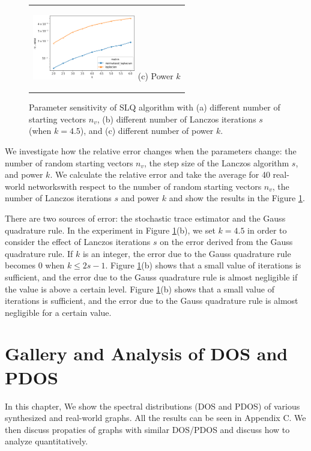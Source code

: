 \documentclass[senior,final,11pt]{iscs-thesis}
\begin{document}
\begin{figure}[htbp]
\begin{center}
\begin{tabular}{c}
\begin{minipage}{0.33\hsize}
          \begin{center}
            \includegraphics[clip, width=4.5cm]{./figure/plot_param_k.png}
            \hspace{1.6cm} (c) Power $k$
          \end{center}
        \end{minipage}
      \end{tabular}
      \caption{Parameter sensitivity of SLQ algorithm with (a) different number of starting vectors $n_v$, (b) different number of Lanczos iterations $s$ (when $k=4.5$), and (c) different number of power $k$. }
      \label{fig:param_sensitivity}
    \end{center}
  \end{figure}

We investigate how the relative error changes when the parameters change: the number of random starting vectors $n_v$, the step size of the Lanczos algorithm $s$, and power $k$. We calculate the relative error and take the average for 40 real-world networkswith respect to the number of random starting vectors $n_v$, the number of Lanczos iterations $s$ and power $k$ and show the results in the Figure \ref{fig:param_sensitivity}.

There are two sources of error: the stochastic trace estimator and the Gauss quadrature rule. In the experiment in Figure \ref{fig:param_sensitivity}(b), we set $k=4.5$ in order to consider the effect of Lanczos iterations $s$ on the error derived from the Gauss quadrature rule. If $k$ is an integer, the error due to the Gauss quadrature rule becomes 0 when $k \leq 2s-1$. Figure \ref{fig:param_sensitivity}(b) shows that a small value of iterations is sufficient, and the error due to the Gauss quadrature rule is almost negligible if the value is above a certain level. Figure \ref{fig:param_sensitivity}(b) shows that a small value of iterations is sufficient, and the error due to the Gauss quadrature rule is almost negligible for a certain value.




\chapter{Gallery and Analysis of DOS and PDOS}
In this chapter, We show the spectral distributions (DOS and PDOS) of various synthesized and real-world graphs. All the results can be seen in Appendix C. We then discuss propaties of graphs with similar DOS/PDOS and discuss how to analyze quantitatively.
\end{document}
